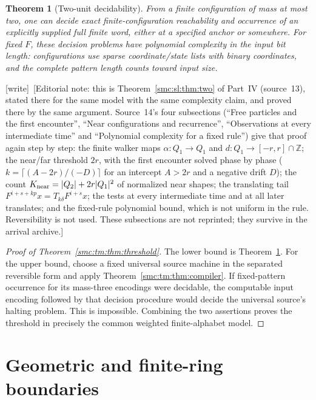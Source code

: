 \documentclass[11pt,letterpaper]{article}
\numberwithin{equation}{section}
\newtheorem{theorem}{Theorem}[section]
\theoremstyle{definition}
\theoremstyle{remark}
\newcommand{\Z}{\mathbb Z}
\newcommand{\wtag}{\textup{[write]}}
\begin{document}
\begin{theorem}[Two-unit decidability]\label{smc:tm:thm:two}
From a finite configuration of mass at most two, one can decide exact finite-configuration reachability and occurrence of an explicitly supplied full finite word, either at a specified anchor or somewhere. For fixed $F$, these decision problems have polynomial complexity in the input bit length: configurations use sparse coordinate/state lists with binary coordinates, and the complete pattern length counts toward input size.
\end{theorem}

\wtag\ [Editorial note: this is Theorem~\ref{smc:sl:thm:two} of Part~IV (source~13), stated there for the same model with the same complexity claim, and proved there by the same argument. Source~14's four subsections (``Free particles and the first encounter'', ``Near configurations and recurrence'', ``Observations at every intermediate time'' and ``Polynomial complexity for a fixed rule'') give that proof again step by step: the finite walker maps $\alpha:Q_1\to Q_1$ and $d:Q_1\to[-r,r]\cap\Z$; the near/far threshold $2r$, with the first encounter solved phase by phase ($k=\lceil(A-2r)/(-D)\rceil$ for an intercept $A>2r$ and a negative drift $D$); the count $K_{\rm near}=|Q_2|+2r|Q_1|^2$ of normalized near shapes; the translating tail $F^{i+s+kp}x=T_{k\delta}F^{i+s}x$; the tests at every intermediate time and at all later translates; and the fixed-rule polynomial bound, which is not uniform in the rule. Reversibility is not used. These subsections are not reprinted; they survive in the arrival archive.]

\begin{proof}[Proof of Theorem~\ref{smc:tm:thm:threshold}]
The lower bound is Theorem~\ref{smc:tm:thm:two}. For the upper bound, choose a fixed universal source machine in the separated reversible form and apply Theorem~\ref{smc:tm:thm:compiler}. If fixed-pattern occurrence for its mass-three encodings were decidable, the computable input encoding followed by that decision procedure would decide the universal source's halting problem. This is impossible. Combining the two assertions proves the threshold in precisely the common weighted finite-alphabet model.
\end{proof}

\section{Geometric and finite-ring boundaries}\label{smc:tm:sec:boundaries}
\end{document}
